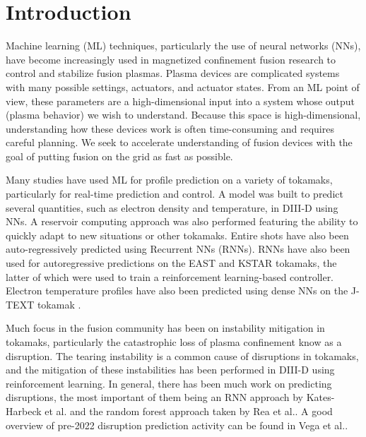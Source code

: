 

\section{Introduction}

Machine learning (ML) techniques, particularly the use of neural networks (NNs), have become increasingly used in magnetized confinement fusion research to control and stabilize fusion plasmas. Plasma devices are complicated systems with many possible settings, actuators, and actuator states. From an ML point of view, these parameters are a high-dimensional input into a system whose output (plasma behavior) we wish to understand. Because this space is high-dimensional, understanding how these devices work is often time-consuming and requires careful planning. We seek to accelerate understanding of fusion devices with the goal of putting fusion on the grid as fast as possible.  

Many studies have used ML for profile prediction on a variety of tokamaks, particularly for real-time prediction and control. A model was built to predict several quantities, such as electron density and temperature, in DIII-D using NNs\cite{abbate_data-driven_2021}. A reservoir computing approach was also performed\cite{jalalvand_real-time_2022} featuring the ability to quickly adapt to new situations or other tokamaks. Entire shots have also been auto-regressively predicted using Recurrent NNs (RNNs)\cite{char_full_2024}. RNNs have also been used for autoregressive predictions on the EAST\cite{wan_east_2022} and KSTAR tokamaks\cite{seo_feedforward_2021,seo_development_2022}, the latter of which were used to train a reinforcement learning-based controller. Electron temperature profiles have also been predicted using dense NNs on the J-TEXT tokamak \cite{dong_machine_2021}.

Much focus in the fusion community has been on instability mitigation in tokamaks, particularly the catastrophic loss of plasma confinement know as a disruption. The tearing instability is a common cause of disruptions in tokamaks, and the mitigation of these instabilities has been performed in DIII-D using reinforcement learning\cite{seo_avoiding_2024}. In general, there has been much work on predicting disruptions, the most important of them being an RNN approach by Kates-Harbeck et al.\cite{kates-harbeck_predicting_2019} and the random forest approach taken by Rea et al.\cite{rea_real-time_2019}. A good overview of pre-2022 disruption prediction activity can be found in Vega et al.\cite{vega_disruption_2022}. 

